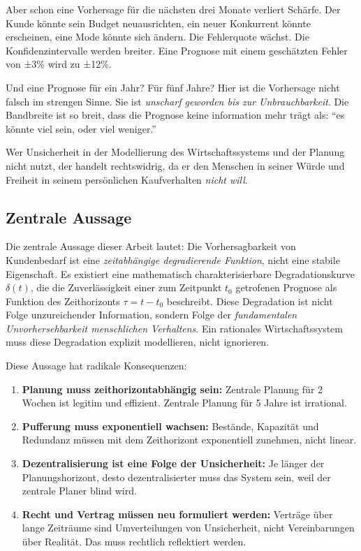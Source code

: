 \documentclass[a4paper, 12pt, twoside, openright]{report}
\theoremstyle{definition}
\theoremstyle{definition}
\begin{document}
Aber schon eine Vorhersage für die nächsten drei Monate verliert Schärfe. Der Kunde könnte sein Budget neuausrichten, ein neuer Konkurrent könnte erscheinen, eine Mode könnte sich ändern. Die Fehlerquote wächst. Die Konfidenzintervalle werden breiter. Eine Prognose mit einem geschätzten Fehler von ±3\% wird zu ±12\%.

Und eine Prognose für ein Jahr? Für fünf Jahre? Hier ist die Vorhersage nicht falsch im strengen Sinne. Sie ist \emph{unscharf geworden bis zur Unbrauchbarkeit}. Die Bandbreite ist so breit, dass die Prognose keine information mehr trägt als: ``es könnte viel sein, oder viel weniger.''

Wer Unsicherheit in der Modellierung des Wirtschaftssystems und der Planung nicht nutzt, der handelt rechtswidrig, da er den Menschen in seiner Würde und Freiheit in seinem persönlichen Kaufverhalten \textit{nicht will}.

\subsection{Zentrale Aussage}

Die zentrale Aussage dieser Arbeit lautet: Die Vorhersagbarkeit von Kundenbedarf ist eine \emph{zeitabhängige degradierende Funktion}, nicht eine stabile Eigenschaft. Es existiert eine mathematisch charakterisierbare Degradationskurve $\delta(t)$, die die Zuverlässigkeit einer zum Zeitpunkt $t_0$ getrofenen Prognose als Funktion des Zeithorizonts $\tau = t - t_0$ beschreibt. Diese Degradation ist nicht Folge unzureichender Information, sondern Folge der \emph{fundamentalen Unvorhersehbarkeit menschlichen Verhaltens}. Ein rationales Wirtschaftssystem muss diese Degradation explizit modellieren, nicht ignorieren.

Diese Aussage hat radikale Konsequenzen:

\begin{enumerate}[label=(\roman*)]
  \item \textbf{Planung muss zeithorizontabhängig sein:} Zentrale Planung für 2 Wochen ist legitim und effizient. Zentrale Planung für 5 Jahre ist irrational.
  
  \item \textbf{Pufferung muss exponentiell wachsen:} Bestände, Kapazität und Redundanz müssen mit dem Zeithorizont exponentiell zunehmen, nicht linear.
  
  \item \textbf{Dezentralisierung ist eine Folge der Unsicherheit:} Je länger der Planungshorizont, desto dezentralisierter muss das System sein, weil der zentrale Planer blind wird.
  
  \item \textbf{Recht und Vertrag müssen neu formuliert werden:} Verträge über lange Zeiträume sind Umverteilungen von Unsicherheit, nicht Vereinbarungen über Realität. Das muss rechtlich reflektiert werden.
\end{enumerate}
\end{document}
